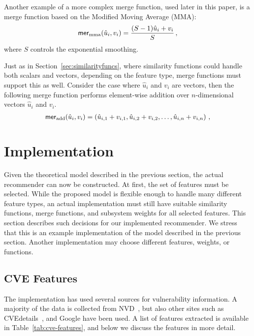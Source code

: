 {Another example of a more complex merge function, used later in this paper, is a merge function based on the Modified Moving Average (MMA):
\begin{align}
\mathsf{mer}_\text{mma} (\hat{u}_i, v_i) = \frac{(S-1)\hat{u}_i + v_i}{S} \,,
\end{align}
where $S$ controls the exponential smoothing.

Just as in Section~\ref{sec:similarityfuncs}, where similarity functions could handle both scalars and vectors, depending on the feature type, merge functions must support this as well.
Consider the case where $\hat{u}_i$ and $v_i$ are vectors, then the following merge function performs element-wise addition over $n$-dimensional vectors $\hat{u}_i$ and $v_i$.
\begin{align}
\mathsf{mer}_\text{add} (\hat{u}_i, v_i) = \left( \hat{u}_{i,1} + v_{i,1}, \hat{u}_{i,2} + v_{i,2}, \ldots, \hat{u}_{i,n} + v_{i,n} \right) \,,
\end{align}


\section{Implementation} \label{sec:implementation}

Given the theoretical model described in the previous section, the actual recommender can now be constructed.
At first, the set of features must be selected.
While the proposed model is flexible enough to handle many different feature types, an actual implementation must still have suitable similarity functions, merge functions, and subsystem weights for all selected features.
This section describes such decisions for our implemented recommender. %
We stress that this is an example implementation of the model described in the previous section. Another implementation may choose different features, weights, or functions.

\subsection{CVE Features} \label{sec:features} %
The implementation has used several sources for vulnerability information.
A majority of the data is collected from NVD~\cite{nvd}, but also other sites such as CVEdetails~\cite{cve-details}, and Google have been used.
A list of features extracted is available in Table~\ref{tab:cve-features}, and below we discuss the features in more detail.

}
